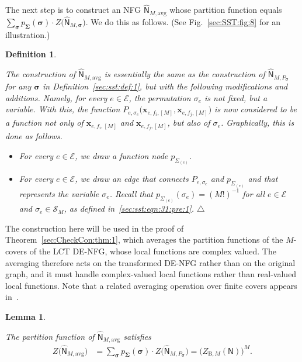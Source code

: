 \documentclass[journal]{IEEEtran}
\newcommand{\add}[1]{{\color{black}#1}}
\newtheorem{lemma}[theorem]{Lemma}
\newtheorem{definition}[theorem]{Definition}
\newcommand{\manualendsymbol}[1]{%
  \leavevmode\unskip\penalty9999\hbox{}\nobreak\hfill
  \quad\hbox{#1}}
\newcommand{\edefinition}{\manualendsymbol{\ensuremath{\triangle}}}
\newcommand{\vect}[1]{ \bm{#1} }
\newcommand{\set}[1]{\mathcal{#1}}
\newcommand{\setEfull}{ \mathcal{E} }
\newcommand{\vx}{ \vect{x} }
\newcommand{\graphN}{ \mathsf{N} }
\newcommand{\ZBM}{ Z_{\mathrm{B},M} }
\newcommand{\hgraphN}{ \hat{\graphN} }
\newcommand{\Sigmae}{\Sigma_{(e)}}
\newcommand{\vsigma}{\vect{\sigma}}
\newcommand{\vSigma}{\vect{\Sigma}}
\newcommand{\hgraphNavg}{ \hat{\graphN}_{M,\mathrm{avg}} }
\newcommand{\efi}{ e,f_i }
\newcommand{\efj}{ e,f_j }
\newcommand{\hgraphPsig}{ \hgraphN_{M,P_{\vsigma}} }
\begin{document}
The next step is to construct an NFG $\hgraphNavg$ whose partition function
equals
$\sum_{\vsigma} p_{\vSigma}(\vsigma) \cdot Z\bigl( \hgraphN_{M,\vsigma}
  \bigr)$. We do this as follows. (See Fig.~\ref{sec:SST:fig:8} for an
illustration.)

\begin{definition}
  \label{sec:sst:def:2}

  The construction of $\hgraphNavg$ is essentially the same as the
  construction of $\hgraphPsig$ for any $\vsigma$ in \add{Definition~\ref{sec:sst:def:1}}, but with the
  following modifications and additions.
  Namely, for every $e \in \setEfull$, the
  permutation $\sigma_e$ is not fixed, but a variable. With this, the function
  $P_{e,\sigma_e}\bigl( \vx_{\efi,[M]}, \vx_{\efj,[M]} \bigr)$ is now considered to be a function
  not only of $\vx_{\efi,[M]}$ and $\vx_{\efj,[M]}$, but also of
  $\sigma_e$. Graphically, this is done as follows.
  \begin{itemize}

    \item For every $e \in \setEfull$, we draw a function node $p_{\Sigmae}$.

    \item For every $e \in \setEfull$, we draw an edge that connects
          $P_{e,\sigma_e}$ and $p_{\Sigmae}$ and that represents the variable
          $\sigma_e$. Recall that $ p_{\Sigmae}( \sigma_{e} ) = (M!)^{-1} $ for
          all $ e \in \setEfull $ and $ \sigma_{e} \in \set{S}_{M} $, as defined
          in~\eqref{sec:sst:eqn:31:pre:1}.\edefinition

  \end{itemize}
\end{definition}

\add{The construction here will be used in the proof of
  Theorem~\ref{sec:CheckCon:thm:1}, which averages the partition functions of
  the $M$-covers of the LCT DE-NFG, whose local functions are complex
  valued. The averaging therefore acts on the transformed DE-NFG rather than
  on the original graph, and it must handle complex-valued local functions
  rather than real-valued local functions. Note that a related averaging
  operation over finite covers appears in~\cite{Csikvari2022}. }

\begin{lemma}
  \label{sec:sst:lem:1}

  The partition function of $\hgraphNavg$ satisfies
  \begin{align*}
    Z\bigl( \hgraphNavg \bigr)
     & = \sum_{\vsigma}
    p_{\vSigma}(\vsigma)
    \cdot Z\bigl( \hgraphPsig \bigr)
    = \bigl( \ZBM(\graphN) \bigr)^{\! M}.
  \end{align*}
\end{lemma}
\end{document}
